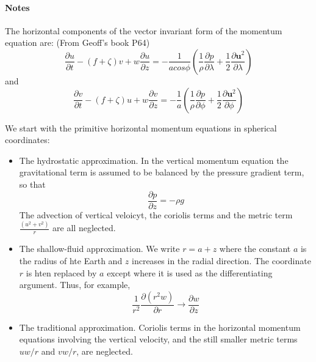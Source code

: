 \documentclass[..\EOYR.tex]{subfiles}
\begin{document}
\paragraph{Notes}
The horizontal components of the vector invariant form of the momentum equation are: (From Geoff's book P64)
\begin{equation}\label{VIMomentumU}
    \frac{\partial u}{\partial t} - \left(f+\zeta\right)v + w\frac{\partial u}{\partial z} = -\frac{1}{a cos \phi}\left(\frac{1}{\rho}\frac{\partial p}{\partial \lambda} + \frac{1}{2}\frac{\partial \mathbf{u}^2}{\partial \lambda}\right)
\end{equation}
and
\begin{equation}\label{VIMomentumV}
    \frac{\partial v}{\partial t} - \left(f+\zeta\right)u + w\frac{\partial v}{\partial z} = -\frac{1}{a}\left(\frac{1}{\rho}\frac{\partial p}{\partial \phi} + \frac{1}{2}\frac{\partial \mathbf{u}^2}{\partial \phi}\right)
\end{equation}

We start with the primitive horizontal momentum equations in spherical coordinates:
\begin{itemize}
    \item The hydrostatic approximation. In the vertical momentum equation the gravitational term is assumed to be balanced by the pressure gradient term, so that
        \begin{equation}
            \frac{\partial p}{\partial z} = -\rho g
        \end{equation}
        The advection of vertical veloicyt, the coriolis terms and the metric term $\frac{(u^2 + v^2)}{r}$ are all neglected.
    \item The shallow-fluid approximation. We write $r=a+z$ where the constant $a$ is the radius of hte Earth and $z$ increases in the radial direction. The coordinate $r$ is hten replaced by $a$ except where it is used as the differentiating argument. Thus, for example,
        \begin{equation}
            \frac{1}{r^2}\frac{\partial \left(r^2 w\right)}{\partial r} \to \frac{\partial w}{\partial z}
        \end{equation}
    \item The traditional approximation. Coriolis terms in the horizontal momentum equations involving the vertical velocity, and the still smaller metric terms $uw/r$ and $vw/r$, are neglected.
\end{itemize}
\end{document}
